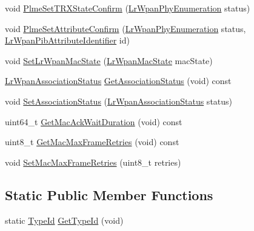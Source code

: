 \begin{DoxyCompactItemize}
\item 
void \hyperlink{classns3_1_1LrWpanMac_a179b41ff2bf7435896b150cf83a00f02}{Plme\+Set\+T\+R\+X\+State\+Confirm} (\hyperlink{group__lr-wpan_ga6494269d13d45c511a07b7ccbb1de754}{Lr\+Wpan\+Phy\+Enumeration} status)
\item 
void \hyperlink{classns3_1_1LrWpanMac_aa28b4bf7ea32aaf9b0c8554e384f279a}{Plme\+Set\+Attribute\+Confirm} (\hyperlink{group__lr-wpan_ga6494269d13d45c511a07b7ccbb1de754}{Lr\+Wpan\+Phy\+Enumeration} status, \hyperlink{group__lr-wpan_gae6da9958c1a7194ce9160d866d4164bc}{Lr\+Wpan\+Pib\+Attribute\+Identifier} id)
\item 
void \hyperlink{classns3_1_1LrWpanMac_a6749a353feb70bbb851b03477f56dc69}{Set\+Lr\+Wpan\+Mac\+State} (\hyperlink{group__lr-wpan_ga02ee7efd682937a8781f5e6101f61884}{Lr\+Wpan\+Mac\+State} mac\+State)
\item 
\hyperlink{group__lr-wpan_ga807185d7d6ea3364bd69c73e4095af30}{Lr\+Wpan\+Association\+Status} \hyperlink{classns3_1_1LrWpanMac_aab3b217260099533f65c4a8fb735bc3b}{Get\+Association\+Status} (void) const 
\item 
void \hyperlink{classns3_1_1LrWpanMac_a846c85d19051d08611e1433e9341ae82}{Set\+Association\+Status} (\hyperlink{group__lr-wpan_ga807185d7d6ea3364bd69c73e4095af30}{Lr\+Wpan\+Association\+Status} status)
\item 
uint64\+\_\+t \hyperlink{classns3_1_1LrWpanMac_af1ee95318d31af6be902e8550d3f7c6b}{Get\+Mac\+Ack\+Wait\+Duration} (void) const 
\item 
uint8\+\_\+t \hyperlink{classns3_1_1LrWpanMac_a7d7e6fe3caffd148bd144349512591df}{Get\+Mac\+Max\+Frame\+Retries} (void) const 
\item 
void \hyperlink{classns3_1_1LrWpanMac_af8c7c06cda4f237a958b7fa144a39cb9}{Set\+Mac\+Max\+Frame\+Retries} (uint8\+\_\+t retries)
\end{DoxyCompactItemize}
\subsection*{Static Public Member Functions}
\begin{DoxyCompactItemize}
\item 
static \hyperlink{classns3_1_1TypeId}{Type\+Id} \hyperlink{classns3_1_1LrWpanMac_a545f55d5d6c1c3aae2344fa42878fabe}{Get\+Type\+Id} (void)
\end{DoxyCompactItemize}
